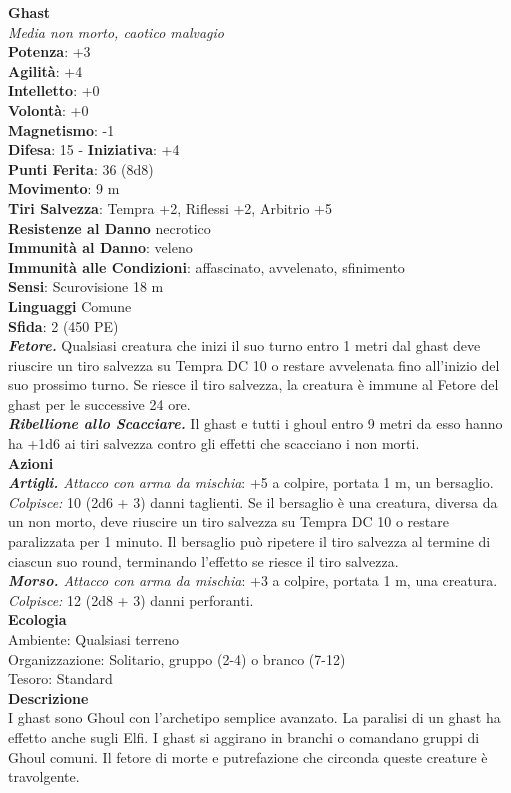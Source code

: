 \begin{multicols}{2}
\medskip\textbf{Ghast}\\
\emph{Media non morto, caotico malvagio}\\
\textbf{Potenza}: +3\\
\textbf{Agilità}: +4\\
\textbf{Intelletto}: +0\\
\textbf{Volontà}: +0\\
\textbf{Magnetismo}: -1\\
\textbf{Difesa}: 15 - \textbf{Iniziativa}: +4\\
\textbf{Punti Ferita}: 36 (8d8)\\
\textbf{Movimento}: 9 m\\
\textbf{Tiri Salvezza}: Tempra +2, Riflessi +2, Arbitrio +5\\
\textbf{Resistenze al Danno} necrotico\\
\textbf{Immunità al Danno}: veleno\\
\textbf{Immunità alle Condizioni}: affascinato, avvelenato, sfinimento\\
\textbf{Sensi}: Scurovisione 18 m \\
\textbf{Linguaggi} Comune\\
\textbf{Sfida}: 2 (450 PE)\smallskip\\
\emph{\textbf{Fetore.}} Qualsiasi creatura che inizi il suo turno entro 1 metri dal ghast deve riuscire un tiro salvezza su Tempra DC 10 o restare avvelenata fino all'inizio del suo prossimo turno. Se riesce il tiro  salvezza, la creatura è immune al Fetore del ghast per le successive 24 ore.\\
\emph{\textbf{Ribellione allo Scacciare.}} Il ghast e tutti i ghoul entro 9 metri da esso hanno ha +1d6 ai tiri salvezza contro gli effetti che scacciano i non morti. \\
\smallskip\textbf{Azioni}\\
\emph{\textbf{Artigli.} Attacco con arma da mischia}: +5 a colpire, portata 1 m, un bersaglio.\\
\emph{Colpisce:} 10 (2d6 + 3) danni taglienti. Se il bersaglio è una creatura, diversa da un non morto, deve riuscire un tiro salvezza su Tempra DC 10 o restare paralizzata per 1 minuto. Il bersaglio può ripetere il tiro salvezza al termine di ciascun suo round, terminando l'effetto se riesce il tiro salvezza.\\
\emph{\textbf{Morso.} Attacco con arma da mischia}: +3 a colpire, portata 1 m, una creatura.\\
\emph{Colpisce:} 12 (2d8 + 3) danni perforanti.\\
\textbf{Ecologia}\\
Ambiente: Qualsiasi terreno\\
Organizzazione: Solitario, gruppo (2-4) o branco (7-12)\\
Tesoro: Standard\\
\textbf{Descrizione}\\
I ghast sono Ghoul con l’archetipo semplice avanzato. La paralisi di un ghast ha effetto anche sugli Elfi. I ghast si aggirano in branchi o comandano gruppi di Ghoul comuni. Il fetore di morte e putrefazione che circonda queste creature è travolgente.\\



\end{multicols}
